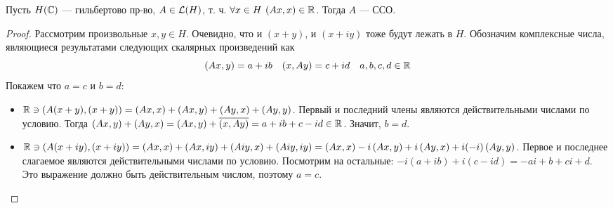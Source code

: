 \begin{unnecessary}
    \begin{statement}
        Пусть \(H( \mathbb{C})\) --- гильбертово пр-во, \(A \in \mathcal{L}(H)\), т. ч. \(\forall x \in H\: \left(Ax, x \right) \in \mathbb{R}\). Тогда \(A\) --- ССО.
    \end{statement}
    \begin{proof}
        Рассмотрим произвольные \(x, y \in H\). Очевидно, что и \((x+y)\), и \((x + iy)\) тоже будут лежать в \(H\). Обозначим комплексные числа, являющиеся результатами следующих скалярных произведений как
        \[(Ax, y) = a + ib \quad (x, Ay) = c + id \quad a, b, c, d \in \mathbb{R}\]
        Покажем что \(a=c\) и \(b=d\):
        \begin{itemize}
            \item[ $\text{[}b = d\text{]}\!\!\!$ ]
            \(\mathbb{R} \ni \left(A(x + y), (x + y) \right) = \left(Ax, x \right) + \left(Ax, y \right) + \left(Ay, x \right) + \left(Ay, y \right)\).
            Первый и последний члены являются действительными числами по условию. Тогда  \(\left(Ax, y \right) + \left(Ay, x \right) = \left(Ax, y \right) + \overline{\left(x, Ay \right)} = a + ib + c - id \in \mathbb{R}\). Значит, \(b=d\).
            \item[$\text{[}a = c\text{]}\!$]
            \(\mathbb{R} \ni \left(A(x + iy), (x + iy) \right) = \left(Ax, x \right) + \left(Ax, iy \right) + \left(Aiy, x \right) + \left(Aiy, iy \right) = \left(Ax, x \right) - i\left(Ax, y \right) + i\left(Ay, x \right) + i(-i)\left(Ay, y \right)\). Первое и последнее слагаемое являются действительными числами по условию. Посмотрим на остальные: \( -i(a + ib) + i(c - id) = -ai + b + ci + d\). Это выражение должно быть действительным числом, поэтому \(a=c\).
        \end{itemize}
    \end{proof}
\end{unnecessary}
